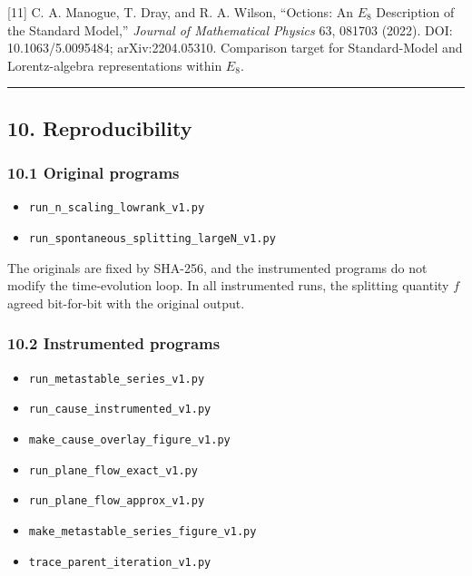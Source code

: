\documentclass[
  a4paper,
]{article}
\providecommand{\tightlist}{%
  \setlength{\itemsep}{0pt}\setlength{\parskip}{0pt}}
\begin{document}
{[}11{]} C. A. Manogue, T. Dray, and R. A. Wilson, ``Octions: An \(E_8\)
Description of the Standard Model,'' \emph{Journal of Mathematical
Physics} 63, 081703 (2022). DOI: 10.1063/5.0095484; arXiv:2204.05310.
Comparison target for Standard-Model and Lorentz-algebra representations
within \(E_8\).

\begin{center}\rule{0.5\linewidth}{0.5pt}\end{center}

\subsection{10. Reproducibility}\label{reproducibility}

\subsubsection{10.1 Original programs}\label{original-programs}

\begin{itemize}
\tightlist
\item
  \texttt{run\_n\_scaling\_lowrank\_v1.py}
\item
  \texttt{run\_spontaneous\_splitting\_largeN\_v1.py}
\end{itemize}

The originals are fixed by SHA-256, and the instrumented programs do not
modify the time-evolution loop. In all instrumented runs, the splitting
quantity \(f\) agreed bit-for-bit with the original output.

\subsubsection{10.2 Instrumented programs}\label{instrumented-programs}

\begin{itemize}
\tightlist
\item
  \texttt{run\_metastable\_series\_v1.py}
\item
  \texttt{run\_cause\_instrumented\_v1.py}
\item
  \texttt{make\_cause\_overlay\_figure\_v1.py}
\item
  \texttt{run\_plane\_flow\_exact\_v1.py}
\item
  \texttt{run\_plane\_flow\_approx\_v1.py}
\item
  \texttt{make\_metastable\_series\_figure\_v1.py}
\item
  \texttt{trace\_parent\_iteration\_v1.py}
\end{itemize}
\end{document}
